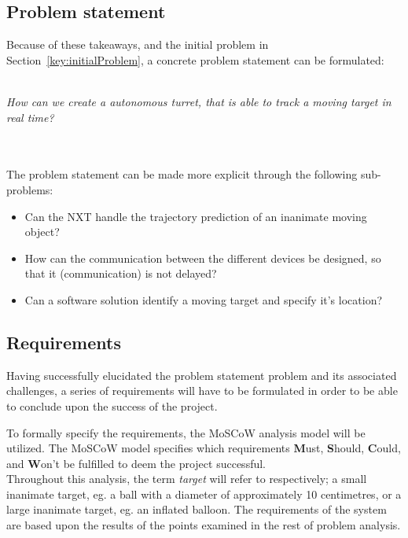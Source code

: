 \subsection{Problem statement}
Because of these takeaways, and the initial problem in Section~\ref{key:initialProblem}, a concrete problem statement can be formulated:\\~\\
\begin{center}
	
	\textit{\large{How can we create a autonomous turret, that is able to track a moving target in real time?}}
\end{center}~\\~\\

The problem statement can be made more explicit through the following sub-problems:
\begin{center}
	\begin{itemize}
		\item Can the NXT handle the trajectory prediction of an inanimate moving object?
		\item How can the communication between the different devices be designed, so that it (communication) is not delayed? 
		\item Can a software solution identify a moving target and specify it's location?
	\end{itemize}
\end{center}


\subsection{Requirements}
Having successfully elucidated the problem statement problem and its associated challenges, a series  of requirements will have to be formulated in order to be able to conclude upon the success of the project.

To formally specify the requirements, the MoSCoW analysis model will be utilized. 
The MoSCoW model specifies which requirements \textbf{M}ust, \textbf{S}hould, \textbf{C}ould, and \textbf{W}on't be fulfilled to deem the project successful.\\

Throughout this analysis, the term \textit{target} will refer to respectively; a small inanimate target, eg{.} a ball with a diameter of approximately 10 centimetres, or a large inanimate target, eg{.} an inflated balloon.
The requirements of the system are based upon the results of the points examined in the rest of problem analysis.

